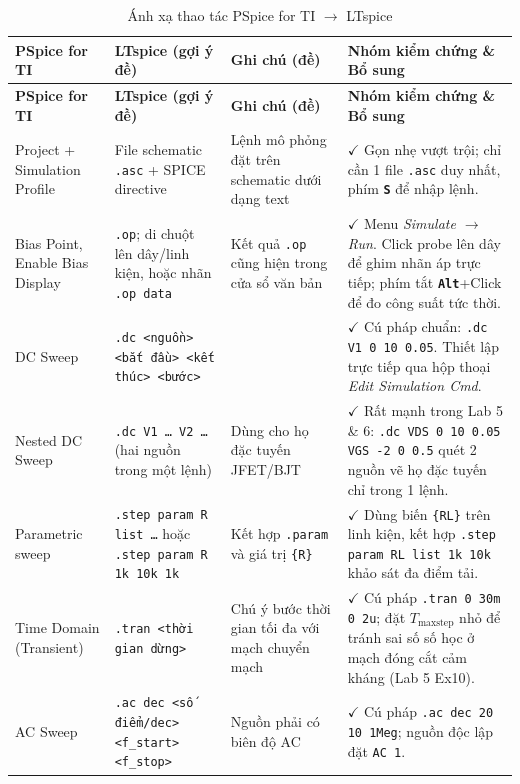 \documentclass[12pt,a4paper]{article}
\newcommand{\key}[1]{\colorbox{gray!20}{\small\texttt{\textbf{#1}}}}
\newcommand{\hc}[1]{\cellcolor{navy}\color{white}\sffamily\bfseries\small #1}
\begin{document}
{\small
\setlength{\tabcolsep}{3.5pt}
\renewcommand{\arraystretch}{1.25}
\begin{longtable}{|p{3.2cm}|p{4.2cm}|p{3.2cm}|p{4.2cm}|}
\caption{Ánh xạ thao tác PSpice for TI $\rightarrow$ LTspice}\label{tab:anhxa}\\
\hline
\hc{PSpice for TI} & \hc{LTspice (gợi ý đề)} & \hc{Ghi chú (đề)} & \hc{Nhóm kiểm chứng \& Bổ sung}\\ \hline\endfirsthead
\hline
\hc{PSpice for TI} & \hc{LTspice (gợi ý đề)} & \hc{Ghi chú (đề)} & \hc{Nhóm kiểm chứng \& Bổ sung}\\ \hline\endhead
Project + Simulation Profile & File schematic \texttt{.asc} + SPICE directive & Lệnh mô phỏng đặt trên schematic dưới dạng text & $\checkmark$ Gọn nhẹ vượt trội; chỉ cần 1 file \texttt{.asc} duy nhất, phím \key{S} để nhập lệnh. \\ \hline
Bias Point, Enable Bias Display & \texttt{.op}; di chuột lên dây/linh kiện, hoặc nhãn \texttt{.op data} & Kết quả \texttt{.op} cũng hiện trong cửa sổ văn bản & $\checkmark$ Menu \textit{Simulate $\rightarrow$ Run}. Click probe lên dây để ghim nhãn áp trực tiếp; phím tắt \key{Alt}+Click để đo công suất tức thời. \\ \hline
DC Sweep & \texttt{.dc <nguồn> <bắt đầu> <kết thúc> <bước>} & & $\checkmark$ Cú pháp chuẩn: \texttt{.dc V1 0 10 0.05}. Thiết lập trực tiếp qua hộp thoại \textit{Edit Simulation Cmd}. \\ \hline
Nested DC Sweep & \texttt{.dc V1 \dots\ V2 \dots} (hai nguồn trong một lệnh) & Dùng cho họ đặc tuyến JFET/BJT & $\checkmark$ Rất mạnh trong Lab 5 \& 6: \texttt{.dc VDS 0 10 0.05 VGS -2 0 0.5} quét 2 nguồn vẽ họ đặc tuyến chỉ trong 1 lệnh. \\ \hline
Parametric sweep & \texttt{.step param R list \dots} hoặc \texttt{.step param R 1k 10k 1k} & Kết hợp \texttt{.param} và giá trị \texttt{\{R\}} & $\checkmark$ Dùng biến \texttt{\{RL\}} trên linh kiện, kết hợp \texttt{.step param RL list 1k 10k} khảo sát đa điểm tải. \\ \hline
Time Domain (Transient) & \texttt{.tran <thời gian dừng>} & Chú ý bước thời gian tối đa với mạch chuyển mạch & $\checkmark$ Cú pháp \texttt{.tran 0 30m 0 2u}; đặt $T_{\text{maxstep}}$ nhỏ để tránh sai số số học ở mạch đóng cắt cảm kháng (Lab 5 Ex10). \\ \hline
AC Sweep & \texttt{.ac dec <số điểm/dec> <f\_start> <f\_stop>} & Nguồn phải có biên độ AC & $\checkmark$ Cú pháp \texttt{.ac dec 20 10 1Meg}; nguồn độc lập đặt \texttt{AC 1}. \\ \hline

\end{longtable}}
\end{document}
